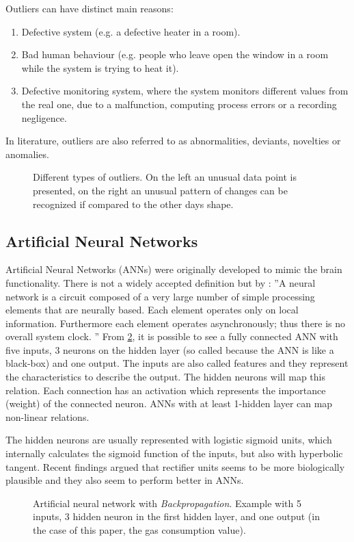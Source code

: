 \documentclass{sig-alternate-sigmod07}
\begin{document}
 Outliers can have distinct main reasons: 
\begin{enumerate}
  \item Defective system (e.g. a defective heater in a room).
  \item Bad human behaviour (e.g. people who leave open the window in a room while the system is trying to heat it).
  \item Defective monitoring system, where the system monitors different values from the real one, due to a malfunction, computing process errors or a recording negligence. 
\end{enumerate}

In literature, outliers are also referred to as abnormalities, deviants, novelties or anomalies.

\begin{figure}[h!]
\centering
{}
\caption{Different types of outliers. On the left an unusual data point is presented, on the right an unusual pattern of changes can be recognized if compared to the other days shape.}
\label{fig:outlierTypes}
\end{figure}


\subsection{Artificial Neural Networks}
Artificial Neural Networks (ANNs) were originally developed to mimic the brain functionality. There is not a widely accepted definition but by \cite{bishop1995neural}: ''A neural network is a circuit composed of a very large number of simple processing elements that are neurally based. Each element operates only on local information. Furthermore each element operates asynchronously; thus there is no overall system clock. '' 
From \cref{fig:ANN}, it is possible to see a fully connected ANN with five inputs, 3 neurons on the hidden layer (so called because the ANN is like a black-box) and one output. The inputs are also called features and they represent the characteristics to describe the output. The hidden neurons will map this relation. Each connection has an activation which represents the importance (weight) of the connected neuron. ANNs with at least 1-hidden layer can map non-linear relations.

The hidden neurons are usually represented with logistic sigmoid units, which internally calculates the sigmoid function of the inputs, but also with hyperbolic tangent. Recent findings argued that rectifier units seems to be more biologically plausible \cite{glorot2011deep} and they also seem to perform better in ANNs. 
\begin{figure}[h!]
\label{fig:ANN}
\centering
{}
\caption{Artificial neural network with \emph{Backpropagation}. Example with 5 inputs, 3 hidden neuron in the first hidden layer, and one output (in the case of this paper, the gas consumption value).}
\end{figure}
\end{document}
